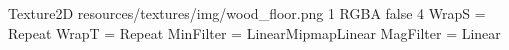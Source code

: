 Texture2D
resources/textures/img/wood_floor.png
1
RGBA
false
4
WrapS = Repeat
WrapT = Repeat
MinFilter = LinearMipmapLinear
MagFilter = Linear
